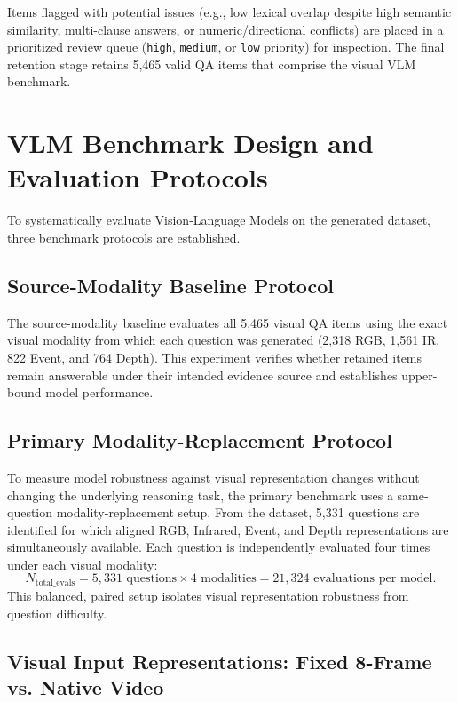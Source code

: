 Items flagged with potential issues (e.g., low lexical overlap despite high semantic similarity, multi-clause answers,
or numeric/directional conflicts) are placed in a prioritized review queue (\texttt{high}, \texttt{medium}, or \texttt{low} priority) for inspection.
The final retention stage retains 5,465 valid QA items that comprise the visual VLM benchmark.


\section{VLM Benchmark Design and Evaluation Protocols}
\label{sec:benchmark_protocols}

To systematically evaluate Vision-Language Models on the generated dataset, three benchmark protocols are established.

\subsection{Source-Modality Baseline Protocol}

The source-modality baseline evaluates all 5,465 visual QA items using the exact visual modality from which each question was generated (2,318 RGB, 1,561 IR, 822 Event, and 764 Depth). This experiment verifies whether retained items remain answerable under their intended evidence source and establishes upper-bound model performance.

\subsection{Primary Modality-Replacement Protocol}

To measure model robustness against visual representation changes without changing the underlying reasoning task, the primary benchmark uses a same-question modality-replacement setup.
From the dataset, 5,331 questions are identified for which aligned RGB, Infrared, Event, and Depth representations are simultaneously available. Each question is independently evaluated four times under each visual modality:
\begin{equation}
    N_{\text{total\_evals}} = 5,331 \text{ questions} \times 4 \text{ modalities} = 21,324 \text{ evaluations per model}.
\end{equation}
This balanced, paired setup isolates visual representation robustness from question difficulty.

\subsection{Visual Input Representations: Fixed 8-Frame vs. Native Video}

